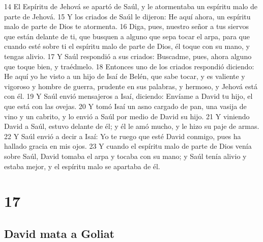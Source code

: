 14 El Espíritu de Jehová se apartó de Saúl, y le atormentaba un espíritu malo de parte de Jehová.
15 Y los criados de Saúl le dijeron: He aquí ahora, un espíritu malo de parte de Dios te atormenta.
16 Diga, pues, nuestro señor a tus siervos que están delante de ti, que busquen a alguno que sepa tocar el arpa, para que cuando esté sobre ti el espíritu malo de parte de Dios, él toque con su mano, y tengas alivio.
17 Y Saúl respondió a sus criados: Buscadme, pues, ahora alguno que toque bien, y traédmelo.
18 Entonces uno de los criados respondió diciendo: He aquí yo he visto a un hijo de Isaí de Belén, que sabe tocar, y es valiente y vigoroso y hombre de guerra, prudente en sus palabras, y hermoso, y Jehová está con él.
19 Y Saúl envió mensajeros a Isaí, diciendo: Envíame a David tu hijo, el que está con las ovejas.
20 Y tomó Isaí un asno cargado de pan, una vasija de vino y un cabrito, y lo envió a Saúl por medio de David su hijo.
21 Y viniendo David a Saúl, estuvo delante de él; y él le amó mucho, y le hizo su paje de armas.
22 Y Saúl envió a decir a Isaí: Yo te ruego que esté David conmigo, pues ha hallado gracia en mis ojos.
23 Y cuando el espíritu malo de parte de Dios venía sobre Saúl, David tomaba el arpa y tocaba con su mano; y Saúl tenía alivio y estaba mejor, y el espíritu malo se apartaba de él.

\chapter{17}

\section*{David mata a Goliat}

